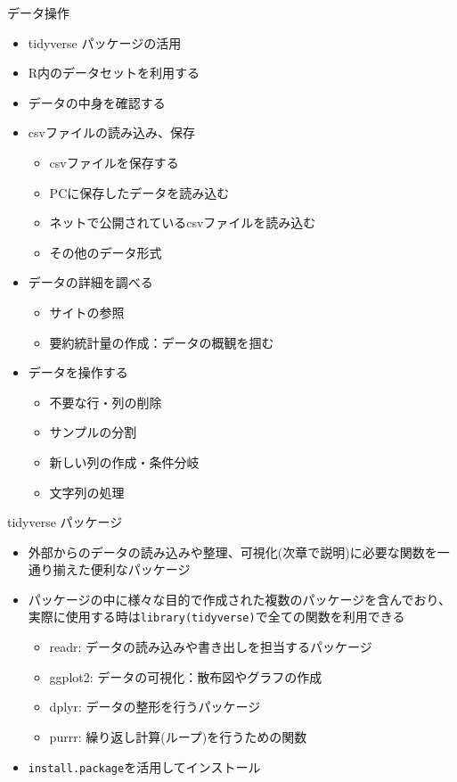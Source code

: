 \documentclass[
  ignorenonframetext,
]{beamer}
\providecommand{\tightlist}{%
  \setlength{\itemsep}{0pt}\setlength{\parskip}{0pt}}
\begin{document}
\begin{frame}[fragile]{データ操作}
\protect\hypertarget{ux30c7ux30fcux30bfux64cdux4f5c}{}
\begin{itemize}
\tightlist
\item
  tidyverse パッケージの活用
\item
  R内のデータセットを利用する
\item
  データの中身を確認する
\item
  csvファイルの読み込み、保存

  \begin{itemize}
  \tightlist
  \item
    csvファイルを保存する
  \item
    PCに保存したデータを読み込む
  \item
    ネットで公開されているcsvファイルを読み込む
  \item
    その他のデータ形式
  \end{itemize}
\item
  データの詳細を調べる

  \begin{itemize}
  \tightlist
  \item
    サイトの参照
  \item
    要約統計量の作成：データの概観を掴む
  \end{itemize}
\item
  データを操作する

  \begin{itemize}
  \tightlist
  \item
    不要な行・列の削除
  \item
    サンプルの分割
  \item
    新しい列の作成・条件分岐
  \item
    文字列の処理
  \end{itemize}
\end{itemize}

\begin{block}{tidyverse パッケージ}
\protect\hypertarget{tidyverse-ux30d1ux30c3ux30b1ux30fcux30b8}{}
\begin{itemize}
\tightlist
\item
  外部からのデータの読み込みや整理、可視化(次章で説明)に必要な関数を一通り揃えた便利なパッケージ
\item
  パッケージの中に様々な目的で作成された複数のパッケージを含んでおり、実際に使用する時は\texttt{library(tidyverse)}で全ての関数を利用できる

  \begin{itemize}
  \tightlist
  \item
    readr: データの読み込みや書き出しを担当するパッケージ
  \item
    ggplot2: データの可視化：散布図やグラフの作成
  \item
    dplyr: データの整形を行うパッケージ
  \item
    purrr: 繰り返し計算(ループ)を行うための関数
  \end{itemize}
\item
  \texttt{install.package}を活用してインストール
\end{itemize}


\end{block}
\end{frame}
\end{document}

